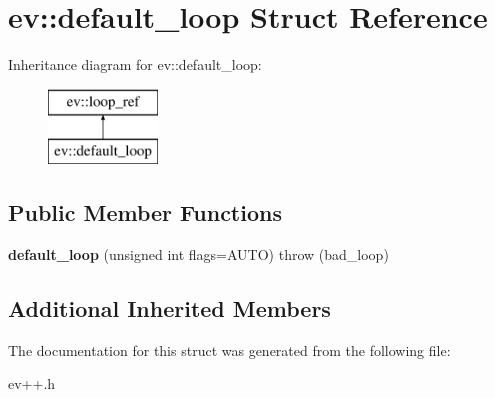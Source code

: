 \hypertarget{structev_1_1default__loop}{}\section{ev\+:\+:default\+\_\+loop Struct Reference}
\label{structev_1_1default__loop}
Inheritance diagram for ev\+:\+:default\+\_\+loop\+:\begin{figure}[H]
\begin{center}
\leavevmode
\includegraphics[height=2.000000cm]{structev_1_1default__loop}
\end{center}
\end{figure}
\subsection*{Public Member Functions}
\begin{DoxyCompactItemize}
\item 
\hypertarget{structev_1_1default__loop_a9df32b0a02a3586070fcd093ecd881fa}{}\label{structev_1_1default__loop_a9df32b0a02a3586070fcd093ecd881fa} 
{\bfseries default\+\_\+loop} (unsigned int flags=A\+U\+TO)  throw (bad\+\_\+loop)
\end{DoxyCompactItemize}
\subsection*{Additional Inherited Members}


The documentation for this struct was generated from the following file\+:\begin{DoxyCompactItemize}
\item 
ev++.\+h\end{DoxyCompactItemize}
